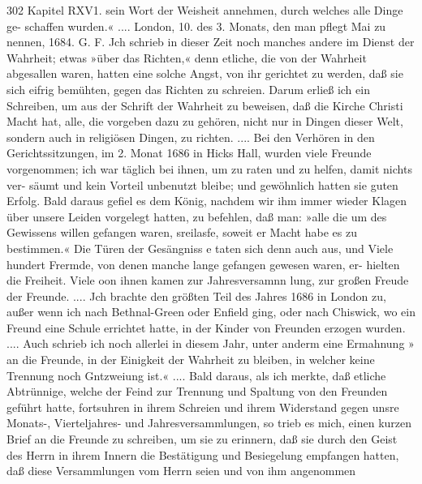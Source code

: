 302 Kapitel RXV1.
sein Wort der Weisheit annehmen, durch welches alle Dinge ge-
schaffen wurden.« ....
London, 10. des 3. Monats, den man pflegt Mai zu nennen, 1684.
G. F.
Jch schrieb in dieser Zeit noch manches andere im Dienst
der Wahrheit; etwas »über das Richten,« denn etliche, die von
der Wahrheit abgesallen waren, hatten eine solche Angst, von ihr
gerichtet zu werden, daß sie sich eifrig bemühten, gegen das Richten
zu schreien. Darum erließ ich ein Schreiben, um aus der Schrift
der Wahrheit zu beweisen, daß die Kirche Christi Macht hat, alle,
die vorgeben dazu zu gehören, nicht nur in Dingen dieser Welt,
sondern auch in religiösen Dingen, zu richten. ....
Bei den Verhören in den Gerichtssitzungen, im 2. Monat 1686
in Hicks Hall, wurden viele Freunde vorgenommen; ich war
täglich bei ihnen, um zu raten und zu helfen, damit nichts ver-
säumt und kein Vorteil unbenutzt bleibe; und gewöhnlich hatten
sie guten Erfolg. Bald daraus gefiel es dem König, nachdem
wir ihm immer wieder Klagen über unsere Leiden vorgelegt hatten,
zu befehlen, daß man: »alle die um des Gewissens willen gefangen
waren, sreilasfe, soweit er Macht habe es zu bestimmen.« Die
Türen der Gesängniss e taten sich denn auch aus, und Viele hundert
Frermde, von denen manche lange gefangen gewesen waren, er-
hielten die Freiheit. Viele oon ihnen kamen zur Jahresversamnn
lung, zur großen Freude der Freunde. ....
Jch brachte den größten Teil des Jahres 1686 in London
zu, außer wenn ich nach Bethnal-Green oder Enfield ging, oder
nach Chiswick, wo ein Freund eine Schule errichtet hatte, in der
Kinder von Freunden erzogen wurden.
.... Auch schrieb ich noch allerlei in diesem Jahr, unter anderm
eine Ermahnung » an die Freunde, in der Einigkeit der Wahrheit zu
bleiben, in welcher keine Trennung noch Gntzweiung ist.« ....
Bald daraus, als ich merkte, daß etliche Abtrünnige, welche
der Feind zur Trennung und Spaltung von den Freunden geführt
hatte, fortsuhren in ihrem Schreien und ihrem Widerstand gegen
unsre Monats-, Vierteljahres- und Jahresversammlungen, so trieb
es mich, einen kurzen Brief an die Freunde zu schreiben, um sie zu
erinnern, daß sie durch den Geist des Herrn in ihrem Innern
die Bestätigung und Besiegelung empfangen hatten, daß diese
Versammlungen vom Herrn seien und von ihm angenommen


